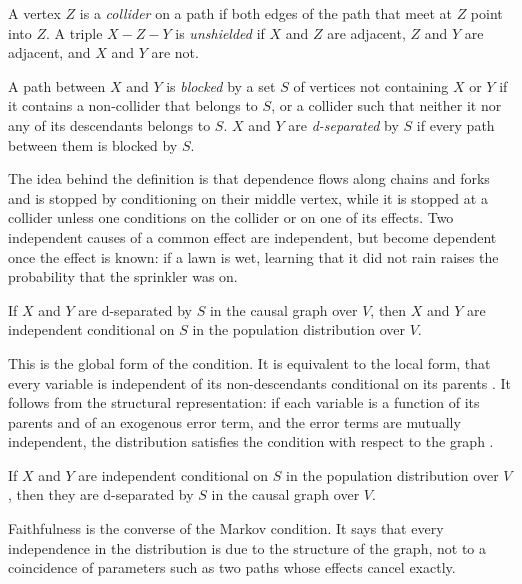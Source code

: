 \documentclass{situationist-preprint}
\begin{document}
\begin{definition}[Collider]\label{d:collider}
A vertex $Z$ is a \emph{collider} on a path if both edges of the path that meet at $Z$ point into $Z$. A triple $X - Z - Y$ is \emph{unshielded} if $X$ and $Z$ are adjacent, $Z$ and $Y$ are adjacent, and $X$ and $Y$ are not.
\end{definition}

\begin{definition}[d-separation]\label{d:dsep}
A path between $X$ and $Y$ is \emph{blocked} by a set $S$ of vertices not containing $X$ or $Y$ if it contains a non-collider that belongs to $S$, or a collider such that neither it nor any of its descendants belongs to $S$. $X$ and $Y$ are \emph{d-separated} by $S$ if every path between them is blocked by $S$.
\end{definition}

The idea behind the definition is that dependence flows along chains and forks and is stopped by conditioning on their middle vertex, while it is stopped at a collider unless one conditions on the collider or on one of its effects. Two independent causes of a common effect are independent, but become dependent once the effect is known: if a lawn is wet, learning that it did not rain raises the probability that the sprinkler was on.

\begin{assumption}\label{a:markov}
If $X$ and $Y$ are d-separated by $S$ in the causal graph over $V$, then $X$ and $Y$ are independent conditional on $S$ in the population distribution over $V$.
\end{assumption}

This is the global form of the condition. It is equivalent to the local form, that every variable is independent of its non-descendants conditional on its parents \citep{Lauritzen1990}. It follows from the structural representation: if each variable is a function of its parents and of an exogenous error term, and the error terms are mutually independent, the distribution satisfies the condition with respect to the graph \citep[Theorem~1.4.1]{Pearl2009}.

\begin{assumption}[Faithfulness]\label{a:faith}
If $X$ and $Y$ are independent conditional on $S$ in the population distribution over $V$, then they are d-separated by $S$ in the causal graph over $V$.
\end{assumption}

Faithfulness is the converse of the Markov condition. It says that every independence in the distribution is due to the structure of the graph, not to a coincidence of parameters such as two paths whose effects cancel exactly.
\end{document}
